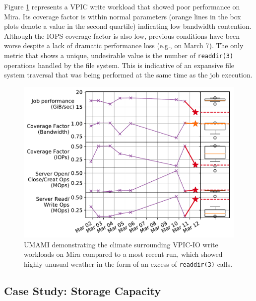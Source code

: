 Figure \ref{fig:umami-mira-fs1-vpic-write} represents a VPIC write workload
that showed poor performance on Mira.
Its coverage factor is within normal parameters (orange lines in the box plots denote a value in the second quartile) indicating low bandwidth contention.
Although the IOPS coverage factor is also low, previous conditions have been worse despite a lack of dramatic performance loss (e.g., on March 7).
The only metric that shows a unique, undesirable value is the number of \texttt{readdir(3)} operations handled by the file system.
This is indicative of an expansive file system traversal that was being performed at the same time as the job execution.

\begin{figure}[t]
    \centering
    \includegraphics[width=1.0\columnwidth]{figs/umami-mira-fs1-vpic-write.pdf}
    \caption{UMAMI demonstrating the climate surrounding VPIC-IO write workloads on Mira compared to a most recent run, which showed highly unusual weather in the form of an excess of \texttt{readdir(3)} calls.
    }
    \label{fig:umami-mira-fs1-vpic-write}
\vspace{-.2in}
\end{figure}

\subsection{Case Study: Storage Capacity}

